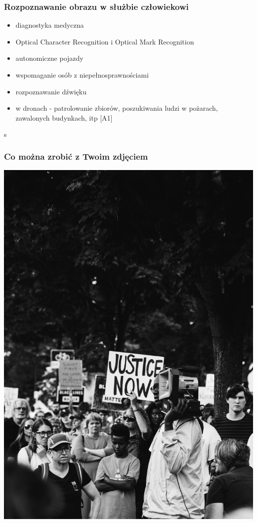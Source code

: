 \documentclass{beamer}
\begin{document}
            \begin{frame}
                \frametitle{Rozpoznawanie obrazu w służbie człowiekowi}
                \begin{itemize}
                    \item diagnostyka medyczna
                    \item Optical Character Recognition i Optical Mark Recognition
                    \item autonomiczne pojazdy
                    \item wspomaganie osób z niepełnosprawnościami
                    \item rozpoznawanie dźwięku
                    \item w dronach - patrolowanie zbiorów, poszukiwania ludzi w pożarach, zawalonych budynkach, itp [A1]
                \end{itemize}
            \end{frame}

            \begin{frame}
                \begin{center}s
                    \frametitle{Co można zrobić z Twoim zdjęciem}
                    \includegraphics[height=0.8\textheight]{pictures/protest.jpg}
                \end{center}
            \end{frame}
\end{document}

